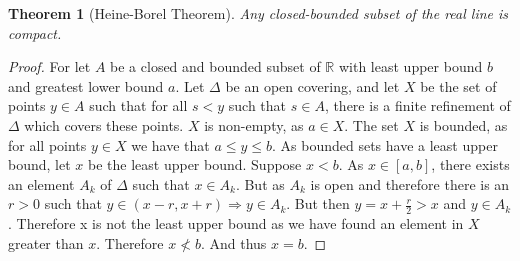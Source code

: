 \documentclass[oneside]{book}
\newtheorem{theorem}{Theorem}[section]
\theoremstyle{definition}
\begin{document}
\begin{theorem}[Heine-Borel Theorem]
Any closed-bounded subset of the real line is compact. 
\end{theorem}
\begin{proof}
For let $A$ be a closed and bounded subset of $\mathbb{R}$ with least upper bound $b$ and greatest lower bound $a$. Let $\Delta$ be an open covering, and let $X$ be the set of points $y\in A$ such that for all $s<y$ such that $s\in A$, there is a finite refinement of $\Delta$ which covers these points. $X$ is non-empty, as $a\in X$. The set $X$ is bounded, as for all points $y\in X$ we have that $a\leq y \leq b$. As bounded sets have a least upper bound, let $x$ be the least upper bound. Suppose $x<b$. As $x\in [a,b]$, there exists an element $A_k$ of $\Delta$ such that $x \in A_k$. But as $A_k$ is open and therefore there is an $r>0$ such that $y\in (x-r,x+r)\Rightarrow y \in A_k$. But then $y=x + \frac{r}{2} > x$ and $y\in A_k$. Therefore x is not the least upper bound as we have found an element in $X$ greater than $x$. Therefore $x\not<b$. And thus $x=b$.
\end{proof}
\end{document}
